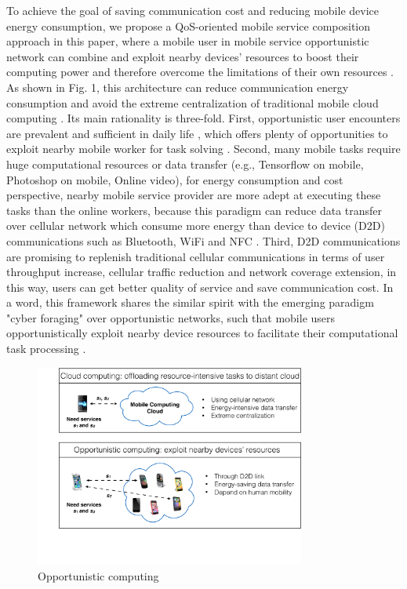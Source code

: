 \documentclass[10pt,journal,compsoc]{IEEEtran}
\begin{document}
To achieve the goal of saving communication cost and reducing mobile device energy consumption, we propose a QoS-oriented mobile service composition approach in this paper, where a mobile user in mobile service opportunistic network can combine and exploit nearby devices' resources to boost their computing power and therefore overcome the limitations of their own resources \cite{giordano2011human}. As shown in Fig. 1, this architecture can reduce communication energy consumption and avoid the extreme centralization of traditional mobile cloud computing \cite{giordano2011human}. Its main rationality is three-fold. First, opportunistic user encounters are prevalent and sufficient in daily life \cite{liu2013exploring}, which offers plenty of opportunities to exploit nearby mobile worker for task solving \cite{chang2015progressive}. Second, many mobile tasks require huge computational resources or data transfer (e.g., Tensorflow on mobile, Photoshop on mobile, Online video), for energy consumption and cost perspective, nearby mobile service provider are more adept at executing these tasks than the online workers, because this paradigm can reduce data transfer over cellular network which consume more energy than device to device (D2D) communications such as Bluetooth, WiFi and NFC \cite{balani2007energy}. Third, D2D communications are promising to replenish traditional cellular communications in terms of user throughput increase, cellular traffic reduction and network coverage extension, in this way, users can get better quality of service and save communication cost\cite{asadi2014survey}. In a word, this framework shares the similar spirit with the emerging paradigm "cyber foraging" over opportunistic networks, such that mobile users opportunistically exploit nearby device resources to facilitate their computational task processing \cite{shi2012serendipity,li2014can,zhang2015offloading}.

\begin{figure}[!t]
\centering
\includegraphics[width=3.5in]{./img/pic1.pdf}
\caption{Opportunistic computing}
\label{fig_opportunistic}
\end{figure}
\end{document}
